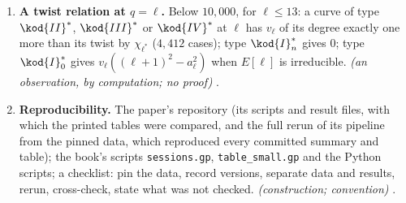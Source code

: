 \begin{enumerate}[label=\textbf{\thechapter.\arabic*}]
$\ell=3,5,7,11,13$; the $36$ failures without the correction are $\Ns$ curves, by exactly one; (eq:thm) as written, with the terms $t_3(E,3)$, gives the same $36$, and $24$ if
the terms at $q=3$ are dropped; the minima of Section sec:iso
equal $e_\ell$ cell by cell; the Tamagawa refinement has no exception ($1{,}050$ and $252$ curves at $\ell=3,5$, as in the paper); strict twist inequalities in
cases (a) and (b). \emph{(proved here, by computation)}
.
\item \textbf{A twist relation at $q=\ell$.} Below $10{,}000$, for $\ell\le13$: a curve of type $\kod{II}^*$, $\kod{III}^*$ or $\kod{IV}^*$ at $\ell$ has $v_\ell$ of its degree exactly one more than its
twist by $\chi_{\ell^*}$ ($4{,}412$ cases); type $\kod{I}_n^*$ gives $0$; type $\kod{I}_0^*$ gives $v_\ell((\ell+1)^2-a_\ell^2)$ when $E[\ell]$ is irreducible. \emph{(an observation, by
computation; no proof)} .
\item \textbf{Reproducibility.} The paper's repository (its scripts and result files, with which the printed tables were compared, and the full rerun of its pipeline from the pinned data, which reproduced every committed summary and table); the book's scripts \texttt{sessions.gp}, \texttt{table\_small.gp} and the Python
scripts; a checklist: pin the data, record versions, separate data and results, rerun, cross-check, state what was not checked. \emph{(construction;
convention)} .
\end{enumerate}

